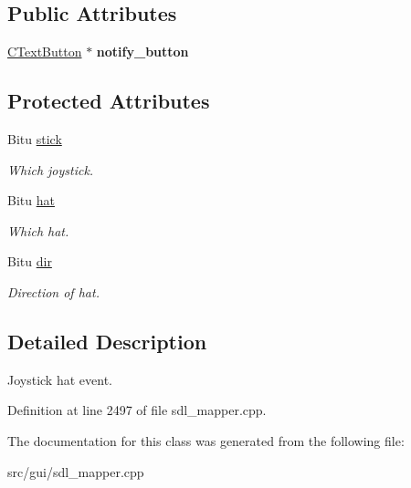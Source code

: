 \subsection*{Public Attributes}
\begin{DoxyCompactItemize}
\item 
\hypertarget{classCJHatEvent_a4d7f2a971b1ecad29e15806dfedfbbf4}{\hyperlink{classCTextButton}{C\-Text\-Button} $\ast$ {\bfseries notify\-\_\-button}}\label{classCJHatEvent_a4d7f2a971b1ecad29e15806dfedfbbf4}

\end{DoxyCompactItemize}
\subsection*{Protected Attributes}
\begin{DoxyCompactItemize}
\item 
\hypertarget{classCJHatEvent_a53d2e407f823a8bd30a2c0d5613cb29b}{Bitu \hyperlink{classCJHatEvent_a53d2e407f823a8bd30a2c0d5613cb29b}{stick}}\label{classCJHatEvent_a53d2e407f823a8bd30a2c0d5613cb29b}

\begin{DoxyCompactList}\small\item\em Which joystick. \end{DoxyCompactList}\item 
\hypertarget{classCJHatEvent_a33cb6a20470c519958c6fd0929bcc7cd}{Bitu \hyperlink{classCJHatEvent_a33cb6a20470c519958c6fd0929bcc7cd}{hat}}\label{classCJHatEvent_a33cb6a20470c519958c6fd0929bcc7cd}

\begin{DoxyCompactList}\small\item\em Which hat. \end{DoxyCompactList}\item 
\hypertarget{classCJHatEvent_a8f7cc4b080b4f6054d6da118209683b7}{Bitu \hyperlink{classCJHatEvent_a8f7cc4b080b4f6054d6da118209683b7}{dir}}\label{classCJHatEvent_a8f7cc4b080b4f6054d6da118209683b7}

\begin{DoxyCompactList}\small\item\em Direction of hat. \end{DoxyCompactList}\end{DoxyCompactItemize}


\subsection{Detailed Description}
Joystick hat event. 

Definition at line 2497 of file sdl\-\_\-mapper.\-cpp.



The documentation for this class was generated from the following file\-:\begin{DoxyCompactItemize}
\item 
src/gui/sdl\-\_\-mapper.\-cpp\end{DoxyCompactItemize}
